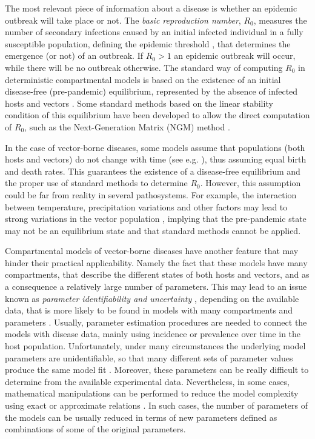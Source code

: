 The most relevant piece of information about a disease is whether an
epidemic outbreak will take place or not. The \textit{basic reproduction
    number}, $R_0$, measures the number of secondary infections caused by an
initial infected individual in a fully susceptible population, defining the
epidemic threshold \cite{Anderson1991, VandenDriessche2017}, that determines
the emergence (or not) of an outbreak. If $R_0>1$ an epidemic outbreak will
occur, while there will be no outbreak otherwise. The standard way of computing
$R_0$ in deterministic compartmental models is based on the existence of an
initial disease-free (pre-pandemic) equilibrium, represented by the absence of
infected hosts and vectors \cite{Lauko2006, Kamgang2008}. Some standard
methods based on the linear stability condition of this equilibrium have been
developed to allow the direct computation of $R_0$, such as the Next-Generation
Matrix (NGM) method \cite{Diekmann2010}.

In the case of vector-borne diseases, some models assume that populations
(both hosts and vectors) do not change with time (see e.g.
\cite{Macdonald1957, Brauer2016, VandenBosch2017}), thus assuming equal birth
and death rates. This guarantees the existence of a disease-free equilibrium
and the proper use of standard methods to determine $R_0$. However, this
assumption could be far from reality in several pathosystems. For example, the
interaction between temperature, precipitation variations and other factors may
lead to strong variations in the vector population
\cite{garms1979studies,Rocklov2020}, implying that the pre-pandemic state may
not be an equilibrium state and that standard methods cannot be applied.

Compartmental models of vector-borne diseases have another feature that may
hinder their practical applicability. Namely the fact that these models have
many compartments, that describe the different states of both hosts and
vectors, and as a consequence a relatively large number of parameters. This may
lead to an issue known as \textit{parameter identifiability and uncertainty}
\cite{Chowel2017}, depending on the available data, that is more likely to be
found in models with many compartments and parameters \cite{Roosa2019}.
Usually, parameter estimation procedures are needed to connect the models with
disease data, mainly using incidence or prevalence over time in the host
population. Unfortunately, under many circumstances the underlying model
parameters are unidentifiable, so that many different sets of parameter values
produce the same model fit \cite{Kao2018}. Moreover, these parameters can be
really difficult to determine from the available experimental data.
Nevertheless, in some cases, mathematical manipulations can be performed to
reduce the model complexity using exact or approximate relations
\cite{GimenezRomero2021}. In such cases, the number of parameters of the models
can
be usually reduced in terms of new parameters defined as combinations of some
of the original parameters.

